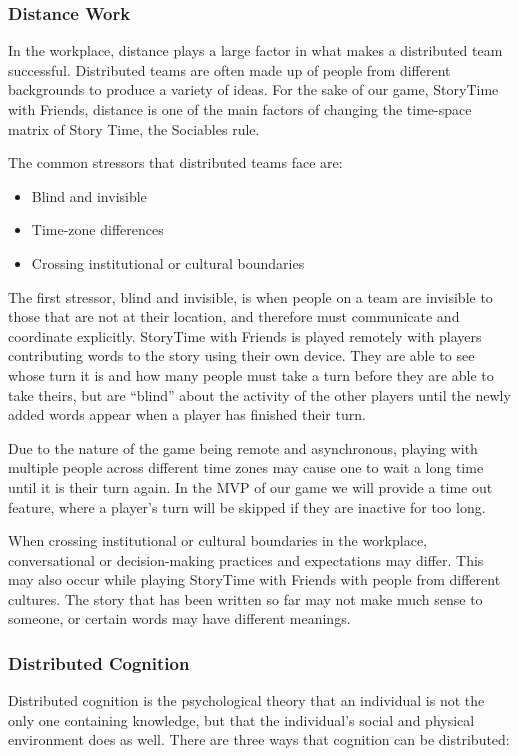 \documentclass{sigchi}
\begin{document}
\subsubsection{Distance Work}
In the workplace, distance plays a large factor in what makes a distributed team successful. Distributed teams are often made up of people from different backgrounds to produce a variety of ideas. \cite{distance} For the sake of our game, StoryTime with Friends, distance is one of the main factors of changing the time-space matrix of Story Time, the Sociables rule.

The common stressors that distributed teams face are:
\begin{itemize}[leftmargin=.5in, noitemsep]
\item Blind and invisible
\item Time-zone differences
\item Crossing institutional or cultural boundaries
\end{itemize}

The first stressor, blind and invisible, is when people on a team are invisible to those that are not at their location, and therefore must communicate and coordinate explicitly. StoryTime with Friends is played remotely with players contributing words to the story using their own device. They are able to see whose turn it is and how many people must take a turn before they are able to take theirs, but are ``blind'' about the activity of the other players until the newly added words appear when a player has finished their turn.

Due to the nature of the game being remote and asynchronous, playing with multiple people across different time zones may cause one to wait a long time until it is their turn again. In the MVP of our game we will provide a time out feature, where a player's turn will be skipped if they are inactive for too long.

When crossing institutional or cultural boundaries in the workplace, conversational or decision-making practices and expectations may differ. This may also occur while playing StoryTime with Friends with people from different cultures. The story that has been written so far may not make much sense to someone, or certain words may have different meanings. 

\subsubsection{Distributed Cognition}
Distributed cognition is the psychological theory that an individual is not the only one containing knowledge, but that the individual's social and physical environment does as well. There are three ways that cognition can be distributed: 
	
\end{document}

